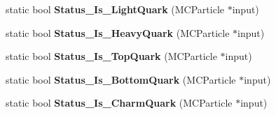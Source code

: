 \begin{DoxyCompactItemize}
\item 
\hypertarget{classToolSet_1_1CMC_ad5954c48a7cf4cb2ed2a139350266c61}{
static bool {\bfseries Status\_\-Is\_\-LightQuark} (MCParticle $\ast$input)}
\label{classToolSet_1_1CMC_ad5954c48a7cf4cb2ed2a139350266c61}

\item 
\hypertarget{classToolSet_1_1CMC_a0e32fa7bb651d3d471da504770ff39d3}{
static bool {\bfseries Status\_\-Is\_\-HeavyQuark} (MCParticle $\ast$input)}
\label{classToolSet_1_1CMC_a0e32fa7bb651d3d471da504770ff39d3}

\item 
\hypertarget{classToolSet_1_1CMC_a0f4beffb9924b6696075b59c1d8770c4}{
static bool {\bfseries Status\_\-Is\_\-TopQuark} (MCParticle $\ast$input)}
\label{classToolSet_1_1CMC_a0f4beffb9924b6696075b59c1d8770c4}

\item 
\hypertarget{classToolSet_1_1CMC_aa67cd425c28243078c8dfac594bdc71f}{
static bool {\bfseries Status\_\-Is\_\-BottomQuark} (MCParticle $\ast$input)}
\label{classToolSet_1_1CMC_aa67cd425c28243078c8dfac594bdc71f}

\item 
\hypertarget{classToolSet_1_1CMC_ab0b28b170ae3a6ee15ffa53138c75f58}{
static bool {\bfseries Status\_\-Is\_\-CharmQuark} (MCParticle $\ast$input)}
\label{classToolSet_1_1CMC_ab0b28b170ae3a6ee15ffa53138c75f58}


\end{DoxyCompactItemize}
